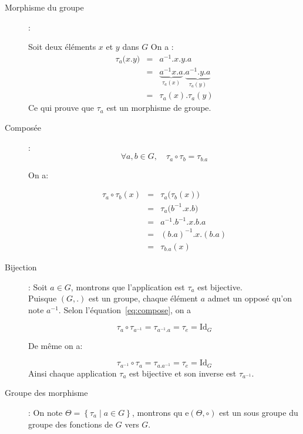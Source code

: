 \documentclass[12pt,a4paper,dvipsnames]{article}
\begin{document}
\begin{description}
    \item[Morphisme du groupe]:

        Soit deux éléments $x$ et $y$ dans $G$
        On a :
        \begin{eqnarray}
            \tau_a\big(x.y\big) &=& a^{-1}.x.y.a\\[4pt]
                                &=&
                                \underbrace{a^{-1}x.a}_{\tau_a(x)}.\underbrace{a^{-1}.y.a}_{\tau_a(y)}\\[4pt]
                                & = & \tau_a(x).\tau_a(y)
        \end{eqnarray}
        Ce qui prouve que $\tau_a$ est un morphisme de groupe.

    \item[Composée]: 
        \begin{equation}
            \forall a,b\in G, \quad \tau_a\circ \tau_b =\tau_{b.a} 
        \end{equation}

        On a:

        \begin{eqnarray}
            \tau_a\circ\tau_b(x) &=&\tau_a\big(\tau_b(x)\big) \\[4pt]
                                 &=& \tau_a\big(b^{-1}.x.b\big)\\
                                 &=& a^{-1}.b^{-1}.x.b.a\\
                                 &=& (b.a)^{-1}.x.(b.a)\\
                                 &=& \tau_{b.a}(x)\label{eq:compose}
        \end{eqnarray}
    \item[Bijection]: Soit $a\in G$, montrons que l'application est $\tau_a$
        est bijective.\\

        Puisque $(G,.)$ est un groupe, chaque élément $a$ admet un opposé qu'on
        note $a^{-1}$. Selon l'équation~\eqref{eq:compose}, on a

        \begin{equation}
            \tau_a\circ\tau_{a^{-1}}= \tau_{a^{-1}.a}=\tau_e=\text{Id}_G
        \end{equation}

De même on a:

        \begin{equation}
            \tau_{a^{-1}}\circ\tau_{a}= \tau_{a.a^{-1}}=\tau_e=\text{Id}_G
        \end{equation}
        Ainsi chaque application $\tau_a$ est bijective et son inverse est
        $\tau_{a^{-1}}$.
    \item[Groupe des morphisme]:
        On note $\Theta=\left\{\tau_a\;|\; a\in G\right\}$, montrons qu
        e$(\Theta, \circ)$ est un sous groupe du groupe des fonctions de $G$
        vers $G$.


\end{description}
\end{document}

